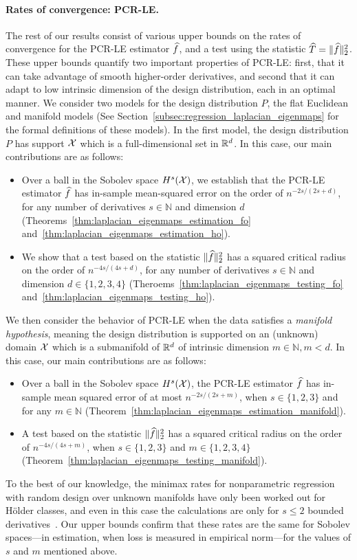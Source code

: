 \paragraph{Rates of convergence: PCR-LE.}
The rest of our results consist of various upper bounds on the rates of convergence for the PCR-LE estimator $\widehat{f}$, and a test using the statistic $\widehat{T} = \|\widehat{f}\|_2^2$. These upper bounds quantify two important properties of PCR-LE: first, that it can take advantage of smooth higher-order derivatives, and second that it can adapt to low intrinsic dimension of the design distribution, each in an optimal manner. We consider two models for the design distribution $P$, the flat Euclidean and manifold models (See Section~\ref{subsec:regression_laplacian_eigenmaps} for the formal definitions of these models). In the first model, the design distribution $P$ has support $\mathcal{X}$ which is a full-dimensional set in $\mathbb{R}^d$. In this case, our main contributions are as follows:
\begin{itemize}
	\item  Over a ball in the Sobolev space $H^{s}(\mathcal{X})$, we establish that the PCR-LE estimator $\widehat{f}$ has in-sample mean-squared error on the order of $n^{-2s/(2s + d)}$, for any number of derivatives $s \in \mathbb{N}$ and dimension $d$ (Theorems~\ref{thm:laplacian_eigenmaps_estimation_fo} and~\ref{thm:laplacian_eigenmaps_estimation_ho}).
	\item We show that a test based on the statistic $\|\widehat{f}\|_2^2$ has a squared critical radius on the order of $n^{-4s/(4s + d)}$, for any number of derivatives $s \in \mathbb{N}$ and dimension $d \in \{1,2,3,4\}$ (Theroems~\ref{thm:laplacian_eigenmaps_testing_fo} and~\ref{thm:laplacian_eigenmaps_testing_ho}).
\end{itemize}
We then consider the behavior of PCR-LE when the data satisfies a \emph{manifold hypothesis}, meaning the design distribution is supported on an (unknown) domain $\mathcal{X}$ which is a submanifold of $\mathbb{R}^d$ of intrinsic dimension $m \in \mathbb{N}, m < d$. In this case, our main contributions are as follows:
\begin{itemize}
	\item Over a ball in the Sobolev space $H^{s}(\mathcal{X})$, the PCR-LE estimator $\widehat{f}$ has in-sample mean squared error of at most $n^{-2s/(2s + m)}$, when $s \in \{1,2,3\}$ and for any $m \in \mathbb{N}$ (Theorem~\ref{thm:laplacian_eigenmaps_estimation_manifold}). 
	\item A test based on the statistic $\|\widehat{f}\|_2^2$ has a squared critical radius on the order of $n^{-4s/(4s + m)}$, when $s \in \{1,2,3\}$ and $m \in \{1,2,3,4\}$ (Theorem~\ref{thm:laplacian_eigenmaps_testing_manifold}).
\end{itemize}
To the best of our knowledge, the minimax rates for nonparametric regression with random design over unknown manifolds have only been worked out for H\"{o}lder classes, and even in this case the calculations are only for $s \leq 2$ bounded derivatives~\citep{bickel2007,yang2016}. Our upper bounds confirm that these rates are the same for Sobolev spaces---in estimation, when loss is measured in empirical norm---for the values of $s$ and $m$ mentioned above.

